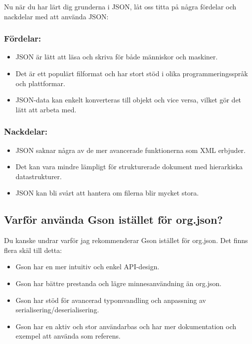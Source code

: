 Nu när du har lärt dig grunderna i JSON, låt oss titta på några fördelar
och nackdelar med att använda JSON:

\hypertarget{fuxf6rdelar}{%
\subsubsection{Fördelar:}\label{fuxf6rdelar}}

\begin{itemize}
\tightlist
\item
  JSON är lätt att läsa och skriva för både människor och maskiner.
\item
  Det är ett populärt filformat och har stort stöd i olika
  programmeringsspråk och plattformar.
\item
  JSON-data kan enkelt konverteras till objekt och vice versa, vilket
  gör det lätt att arbeta med.
\end{itemize}

\hypertarget{nackdelar}{%
\subsubsection{Nackdelar:}\label{nackdelar}}

\begin{itemize}
\tightlist
\item
  JSON saknar några av de mer avancerade funktionerna som XML erbjuder.
\item
  Det kan vara mindre lämpligt för strukturerade dokument med
  hierarkiska datastrukturer.
\item
  JSON kan bli svårt att hantera om filerna blir mycket stora.
\end{itemize}

\hypertarget{varfuxf6r-anvuxe4nda-gson-istuxe4llet-fuxf6r-org.json}{%
\subsection{Varför använda Gson istället för
org.json?}\label{varfuxf6r-anvuxe4nda-gson-istuxe4llet-fuxf6r-org.json}}

Du kanske undrar varför jag rekommenderar Gson istället för org.json.
Det finns flera skäl till detta:

\begin{itemize}
\tightlist
\item
  Gson har en mer intuitiv och enkel API-design.
\item
  Gson har bättre prestanda och lägre minnesanvändning än org.json.
\item
  Gson har stöd för avancerad typomvandling och anpassning av
  serialisering/deserialisering.
\item
  Gson har en aktiv och stor användarbas och har mer dokumentation och
  exempel att använda som referens.
\end{itemize}

